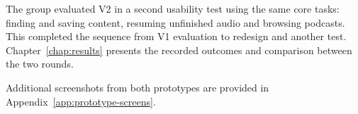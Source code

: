 The group evaluated V2 in a second usability test using the same core tasks:
finding and saving content, resuming unfinished audio and browsing podcasts.
This completed the sequence from V1 evaluation to redesign and another test.
Chapter~\ref{chap:results} presents the recorded outcomes and comparison
between the two rounds.

Additional screenshots from both prototypes are provided in
Appendix~\ref{app:prototype-screens}.
